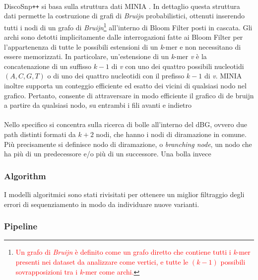\documentclass[../main.tex]{subfiles}
\begin{document}
\paragraph{}
DiscoSnp\texttt{++} si basa sulla struttura dati \textsc{MINIA} \cite{chikhi2013space}. In dettaglio questa struttura dati permette la costruzione di grafi di \textit{Bruijn} probabilistici, ottenuti inserendo tutti i nodi di un grafo di \textit{Bruijn}\footnote{\textcolor{red}{Un grafo di \textit{Bruijn} è definito come un grafo diretto che contiene tutti i \textit{k}-mer presenti nei dataset da analizzare come vertici, e tutte le $(\textit{k}-1)$ possibili sovrapposizioni tra i \textit{k}-mer come archi.}} all'interno di Bloom Filter posti in cascata. Gli archi sono detotti implicitamente dalle interrogazioni fatte ai Bloom Filter per l'appartenenza di tutte le possibili estensioni di un \textit{k}-mer e non necessitano di essere memorizzati. In particolare, un'estensione di un \textit{k}-mer \textit{v} è la concatenazione di un suffisso $\textit{k}-1$ di \textit{v} con uno dei quattro possibili nucleotidi $(A,C,G,T)$ o di uno dei quattro nucleotidi con il prefisso  $\textit{k}-1$ di \textit{v}.
\textsc{MINIA} inoltre supporta un conteggio efficiente ed esatto dei vicini di qualsiasi nodo nel grafico. Pertanto, consente di attraversare in modo efficiente il grafico di de bruijn a partire da qualsiasi nodo, su entrambi i fili avanti e indietro

\paragraph{}
Nello specifico si concentra sulla ricerca di bolle all'interno del dBG, ovvero due path distinti formati da $k+2$ nodi, che hanno i nodi di diramazione in comune. Più precisamente si definisce nodo di diramazione, o \textit{branching node}, un nodo che ha più di un predecessore e/o più di un successore. Una bolla invece

\subsubsection{Algorithm}

I modelli algoritmici sono stati rivisitati per ottenere un miglior filtraggio degli errori di sequenziamento in modo da individuare nuove varianti.

\subsubsection{Pipeline}
\end{document}
